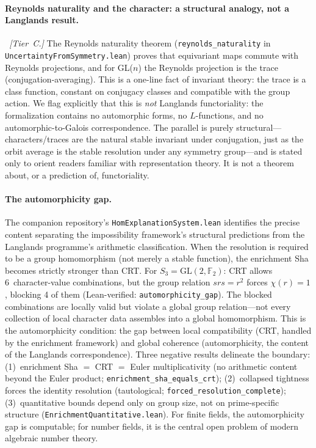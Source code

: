 \documentclass[11pt,a4paper]{article}
\begin{document}
\paragraph{Reynolds naturality and the character: a structural analogy, not a Langlands result.}\emph{~[Tier~C.]}
The Reynolds naturality theorem (\texttt{reynolds\_naturality} in \texttt{UncertaintyFromSymmetry.lean}) proves that equivariant maps commute with Reynolds projections, and for GL($n$) the Reynolds projection is the trace (conjugation-averaging).  This is a one-line fact of invariant theory: the trace is a class function, constant on conjugacy classes and compatible with the group action.  We flag explicitly that this is \emph{not} Langlands functoriality: the formalization contains no automorphic forms, no $L$-functions, and no automorphic-to-Galois correspondence.  The parallel is purely structural---characters/traces are the natural stable invariant under conjugation, just as the orbit average is the stable resolution under any symmetry group---and is stated only to orient readers familiar with representation theory. It is not a theorem about, or a prediction of, functoriality.

\paragraph{The automorphicity gap.}
The companion repository's \texttt{HomExplanationSystem.lean} identifies the precise content separating the impossibility framework's structural predictions from the Langlands programme's arithmetic classification.  When the resolution is required to be a group homomorphism (not merely a stable function), the enrichment Sha becomes strictly stronger than CRT.  For $S_3 = \mathrm{GL}(2, \mathbb{F}_2)$: CRT allows 6~character-value combinations, but the group relation $srs = r^2$ forces $\chi(r) = 1$, blocking 4 of them (Lean-verified: \texttt{automorphicity\_gap}).  The blocked combinations are locally valid but violate a global group relation---not every collection of local character data assembles into a global homomorphism.  This is the automorphicity condition: the gap between local compatibility (CRT, handled by the enrichment framework) and global coherence (automorphicity, the content of the Langlands correspondence).  Three negative results delineate the boundary: (1)~enrichment Sha $=$ CRT $=$ Euler multiplicativity (no arithmetic content beyond the Euler product; \texttt{enrichment\_sha\_equals\_crt}); (2)~collapsed tightness forces the identity resolution (tautological; \texttt{forced\_resolution\_complete}); (3)~quantitative bounds depend only on group size, not on prime-specific structure (\texttt{EnrichmentQuantitative.lean}).  For finite fields, the automorphicity gap is computable; for number fields, it is the central open problem of modern algebraic number theory.
\end{document}
